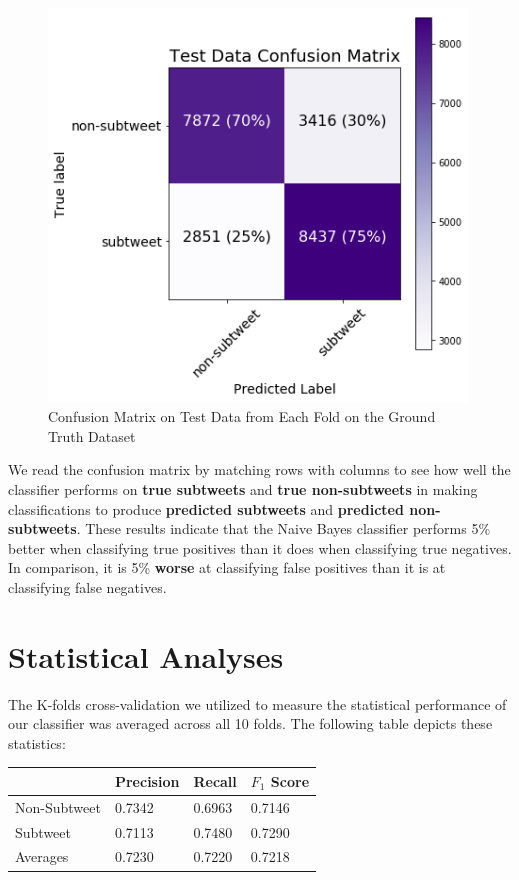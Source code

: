 \documentclass[11pt, twoside, reqno]{book}
\begin{document}
\begin{figure}[H]
	\centering
	\includegraphics[width=30em]{confusion_matrix}
	\caption{Confusion Matrix on Test Data from Each Fold on the Ground Truth Dataset}
	\label{fig:confusion_matrix}
\end{figure}

\noindent
We read the confusion matrix by matching rows with columns to see how well the classifier performs on \textbf{true subtweets} and \textbf{true non-subtweets} in making classifications to produce \textbf{predicted subtweets} and \textbf{predicted non-subtweets}. These results indicate that the Naive Bayes classifier performs 5\% better when classifying true positives than it does when classifying true negatives. In comparison, it is 5\% \textbf{worse} at classifying false positives than it is at classifying false negatives.

\section{Statistical Analyses}
\label{statistical_analyses}

The K-folds cross-validation we utilized to measure the statistical performance of our classifier was averaged across all 10 folds. The following table depicts these statistics:

\begin{center}
	\begin{tabular}{ | p{7em} | p{4em} | p{4em} | p{4em} | }
		\hline
		&Precision&Recall&$F_{1}$ Score
		\\ 
		\hline
		Non-Subtweet&0.7342&0.6963&0.7146
		\\ 
		\hline
		Subtweet&0.7113&0.7480&0.7290
		\\
		\hline
		Averages&0.7230&0.7220&0.7218
		\\
		\hline
	\end{tabular}
\end{center}
\end{document}

